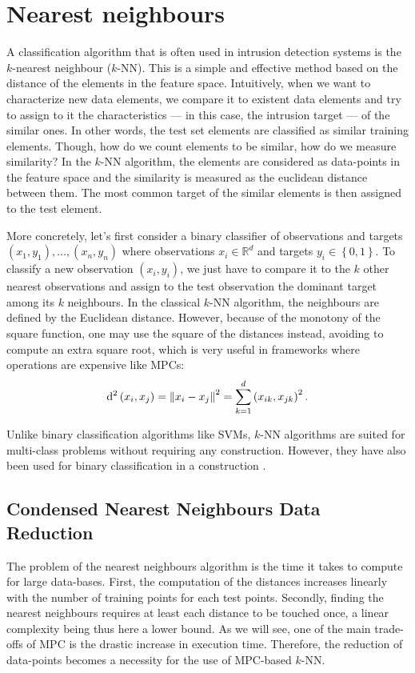 \section{Nearest neighbours}
A classification algorithm that is often used in intrusion detection systems is the $k$-nearest neighbour ($k$-NN). This is a simple and effective method based on the distance of the elements in the feature space. Intuitively, when we want to characterize new data elements, we compare it to existent data elements and try to assign to it the characteristics --- in this case, the intrusion target --- of the similar ones. In other words, the test set elements are classified as similar training elements. Though, how do we count elements to be similar, how do we measure similarity? In the $k$-NN algorithm, the elements are considered as data-points in the feature space and the similarity is measured as the euclidean distance between them. The most common target of the similar elements is then assigned to the test element.

More concretely, let's first consider a binary classifier of observations and targets $\left( x_1, y_1 \right), \ldots , \left( x_n, y_n \right)$ where observations $x_i \in \mathbb{R}^d$ and targets $y_i \in \left\{0,1\right\}$. To classify a new observation $\left( x_i, y_i \right)$, we just have to compare it to the $k$ other nearest observations and assign to the test observation the dominant target among its $k$ neighbours. In the classical $k$-NN algorithm, the neighbours are defined by the Euclidean distance. However, because of the monotony of the square function, one may use the square of the distances instead, avoiding to compute an extra square root, which is very useful in frameworks where operations are expensive like MPCs:
\begin{equation}
    \mathrm{d}^2\left( x_i, x_j \right) = \left\lVert x_i-x_j\right\rVert^2 = \sum_{k=1}^d \left( x_{ik}, x_{jk} \right)^2.
\end{equation}

Unlike binary classification algorithms like SVMs, $k$-NN algorithms are suited for multi-class problems without requiring any construction. However, they have also been used for binary classification in a construction \cite{Aburomman2016ASystem}. 

\subsection{Condensed Nearest Neighbours Data Reduction}
The problem of the nearest neighbours algorithm is the time it takes to compute for large data-bases. First, the computation of the distances increases linearly with the number of training points for each test points. Secondly, finding the nearest neighbours requires at least each distance to be touched once, a linear complexity being thus here a lower bound. As we will see, one of the main trade-offs of MPC is the drastic increase in execution time. Therefore, the reduction of data-points becomes a necessity for the use of MPC-based $k$-NN.

